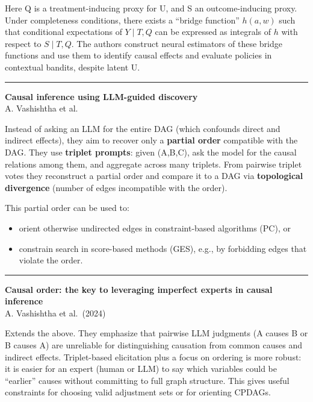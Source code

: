 \documentclass[a5paper]{article}
\providecommand{\tightlist}{%
  \setlength{\itemsep}{0pt}\setlength{\parskip}{0pt}}
\begin{document}
Here Q is a treatment-inducing proxy for U, and S an outcome-inducing
proxy. Under completeness conditions, there exists a ``bridge function''
$h(a,w)$ such that conditional expectations of $Y\mid T,Q$ can be
expressed as integrals of $h$ with respect to $S\mid T,Q$. The authors
construct neural estimators of these bridge functions and use them to
identify causal effects and evaluate policies in contextual bandits,
despite latent U.

\begin{center}\rule{0.5\linewidth}{0.5pt}\end{center}

\textbf{Causal inference using LLM-guided discovery}\\
A. Vashishtha et al.

Instead of asking an LLM for the entire DAG (which confounds direct and
indirect effects), they aim to recover only a \textbf{partial order}
compatible with the DAG. They use \textbf{triplet prompts}: given
(A,B,C), ask the model for the causal relations among them, and
aggregate across many triplets. From pairwise triplet votes they
reconstruct a partial order and compare it to a DAG via
\textbf{topological divergence} (number of edges incompatible with the
order).

This partial order can be used to:

\begin{itemize}
\tightlist
\item
  orient otherwise undirected edges in constraint-based algorithms (PC),
  or
\item
  constrain search in score-based methods (GES), e.g., by forbidding
  edges that violate the order.
\end{itemize}

\begin{center}\rule{0.5\linewidth}{0.5pt}\end{center}

\textbf{Causal order: the key to leveraging imperfect experts in causal
inference}\\
A. Vashishtha et al.~(2024)

Extends the above. They emphasize that pairwise LLM judgments (A causes
B or B causes A) are unreliable for distinguishing causation from common
causes and indirect effects. Triplet-based elicitation plus a focus on
ordering is more robust: it is easier for an expert (human or LLM) to
say which variables could be ``earlier'' causes without committing to
full graph structure. This gives useful constraints for choosing valid
adjustment sets or for orienting CPDAGs.
\end{document}

